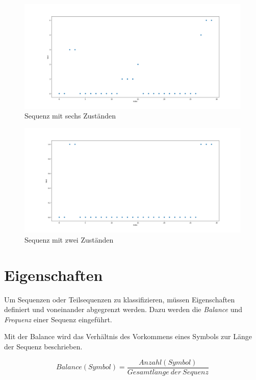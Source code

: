 \begin{figure}
	\centering
		\includegraphics[scale=0.35]{images/Zustandsreduktion/full}
	\caption{Sequenz mit sechs Zuständen}
	\label{fig:full-status}
\end{figure}

\begin{figure}
	\centering
		\includegraphics[scale=0.35]{images/Zustandsreduktion/reduced}
	\caption{Sequenz mit zwei Zuständen}
	\label{fig:reduced-status}
\end{figure}

\section{Eigenschaften}
Um Sequenzen oder Teilsequenzen zu klassifizieren, müssen Eigenschaften definiert und voneinander abgegrenzt werden. Dazu werden die \textit{Balance} und \textit{Frequenz} einer Sequenz eingeführt.

Mit der Balance wird das Verhältnis des Vorkommens eines Symbols zur Länge der Sequenz beschrieben. 

\begin{equation}
\label{eq:balance}
Balance(Symbol) = \frac{Anzahl(Symbol)}{Gesamtl\ddot{a}nge\ der\ Sequenz}
\end{equation}


